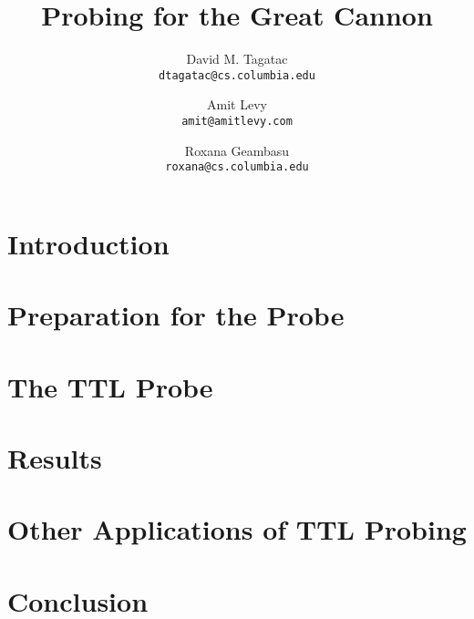 \documentclass[10pt,twocolumn]{article}
\begin{document}
\title{\bf Probing for the Great Cannon}
\author{
	David M. Tagatac\\
	\texttt{dtagatac@cs.columbia.edu}
	\and
	Amit Levy\\
	\texttt{amit@amitlevy.com}
	\and
	Roxana Geambasu\\
	\texttt{roxana@cs.columbia.edu}
}
\date{}
\maketitle
\thispagestyle{empty}

\begin{abstract}

\end{abstract}

\section{Introduction}


\section{Preparation for the Probe}


\section{The TTL Probe}


\section{Results}


\section{Other Applications of TTL Probing}


\section{Conclusion}


\end{document}
